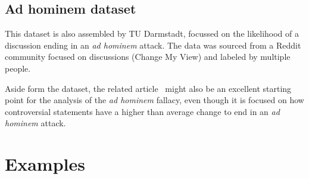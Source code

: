 \documentclass[a4paper]{article}
\begin{document}
\subsection{Ad hominem dataset~\cite{Habernal.et.al.2018.NAACL.adhominem}}
This dataset is also assembled by TU Darmstadt, focussed on the likelihood of a discussion ending in an \emph{ad hominem} attack. The data was sourced from a Reddit community focused on discussions (Change My View) and labeled by multiple people.  

Aside form the dataset, the related article~\cite{Habernal.et.al.2018.NAACL.adhominem} might also be an excellent starting point for the analysis of the \emph{ad hominem} fallacy, even though it is focused on how controversial statements have a higher than average change to end in an \emph{ad hominem} attack.

\section{Examples}



\end{document}
